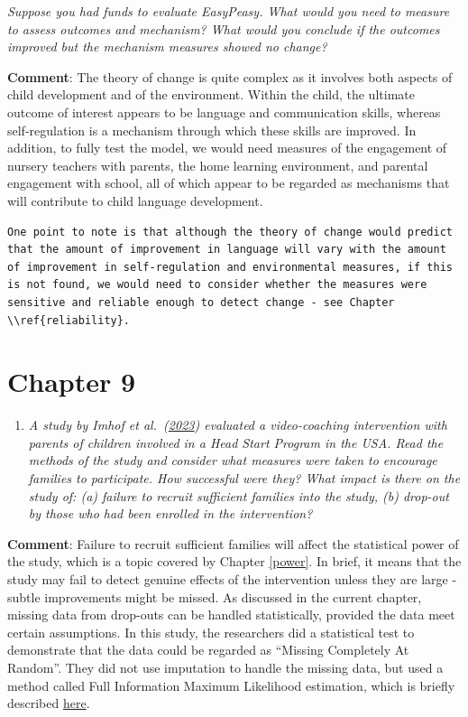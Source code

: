 \documentclass{krantz}
\providecommand{\tightlist}{%
\setlength{\itemsep}{0pt}\setlength{\parskip}{0pt}}
\begin{document}
\emph{Suppose you had funds to evaluate EasyPeasy. What would you need to measure to assess outcomes and mechanism? What would you conclude if the outcomes improved but the mechanism measures showed no change?}

\textbf{Comment}: The theory of change is quite complex as it involves both aspects of child development and of the environment. Within the child, the ultimate outcome of interest appears to be language and communication skills, whereas self-regulation is a mechanism through which these skills are improved. In addition, to fully test the model, we would need measures of the engagement of nursery teachers with parents, the home learning environment, and parental engagement with school, all of which appear to be regarded as mechanisms that will contribute to child language development.

\begin{verbatim}
One point to note is that although the theory of change would predict that the amount of improvement in language will vary with the amount of improvement in self-regulation and environmental measures, if this is not found, we would need to consider whether the measures were sensitive and reliable enough to detect change - see Chapter \\ref{reliability}.
\end{verbatim}

\hypertarget{chapter-9}{%
\section{Chapter 9}\label{chapter-9}}

\begin{enumerate}
\def\labelenumi{\arabic{enumi}.}
\tightlist
\item
  \emph{A study by Imhof et al.~(\href{file:///Users/dorothybishop/Rprojects/EvaluatingWhatWorks2023/_book/dropouts.html\#ref-imhof2023}{2023}) evaluated a video-coaching intervention with parents of children involved in a Head Start Program in the USA. Read the methods of the study and consider what measures were taken to encourage families to participate. How successful were they? What impact is there on the study of: (a) failure to recruit sufficient families into the study, (b) drop-out by those who had been enrolled in the intervention?}
\end{enumerate}

\textbf{Comment}: Failure to recruit sufficient families will affect the statistical power of the study, which is a topic covered by Chapter \ref{power}. In brief, it means that the study may fail to detect genuine effects of the intervention unless they are large - subtle improvements might be missed. As discussed in the current chapter, missing data from drop-outs can be handled statistically, provided the data meet certain assumptions. In this study, the researchers did a statistical test to demonstrate that the data could be regarded as ``Missing Completely At Random''. They did not use imputation to handle the missing data, but used a method called Full Information Maximum Likelihood estimation, which is briefly described \href{https://www.missingdata.nl/missing-data/missing-data-methods/full-information-maximum-likelihood/}{here}.
\end{document}
